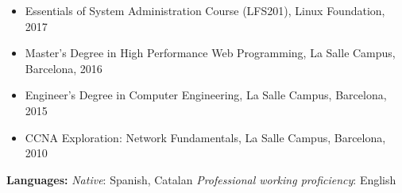 \begin{itemize}[itemsep=0pt]

    \item Essentials of System Administration Course (LFS201), Linux Foundation, 2017

    \item Master's Degree in High Performance Web Programming, La Salle Campus, Barcelona, 2016

    \item Engineer's Degree in Computer Engineering, La Salle Campus, Barcelona, 2015

    \item CCNA Exploration: Network Fundamentals, La Salle Campus, Barcelona, 2010

\end{itemize}

\textbf{Languages:} \hfill \emph{Native}: Spanish, Catalan \hfill \emph{Professional working proficiency}: English